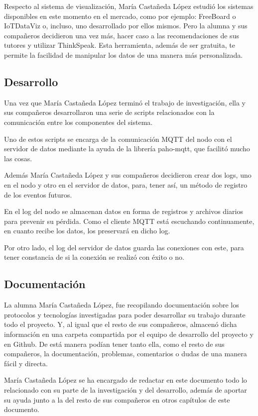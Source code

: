 Respecto al sistema de visualización, María Castañeda López estudió los sistemas disponibles en este momento en el mercado, como por ejemplo: FreeBoard o IoTDataViz o, incluso, uno desarrollado por ellos mismos. Pero la alumna y sus compañeros decidieron una vez más, hacer caso a las recomendaciones de sus tutores y utilizar ThinkSpeak. Esta herramienta, además de ser gratuita, te permite la facilidad de manipular los datos de una manera más personalizada. 

\subsection{Desarrollo}
Una vez que María Castañeda López terminó el trabajo de investigación, ella y sus compañeros desarrollaron una serie de scripts relacionados con la comunicación entre los componentes del sistema.

Uno de estos scripts se encarga de la comunicación MQTT del nodo con el servidor de datos mediante la ayuda de la librería paho-mqtt, que facilitó mucho las cosas.

Además María Castañeda López y sus compañeros decidieron crear dos logs, uno en el nodo y otro en el servidor de datos, para, tener así, un método de registro de los eventos futuros.

En el log del nodo se almacenan datos en forma de registros y archivos diarios para prevenir su pérdida. Como el cliente MQTT está escuchando continuamente, en cuanto recibe los datos, los preservará en dicho log.

Por otro lado, el log del servidor de datos guarda las conexiones con este, para tener constancia de si la conexión se realizó con éxito o no.

\subsection{Documentación}

La alumna María Castañeda López, fue recopilando documentación sobre los protocolos y tecnologías investigadas para poder desarrollar su trabajo durante todo el proyecto. Y, al igual que el resto de sus compañeros, almacenó dicha información en una carpeta compartida por el equipo de desarrollo del proyecto y en Github. De está manera podían tener tanto ella, como el resto de sus compañeros, la documentación, problemas, comentarios o dudas de una manera fácil y directa.

María Castañeda López se ha encargado de redactar en este documento todo lo relacionado con su parte de la investigación y del desarrollo, además de aportar su ayuda junto a la del resto de sus compañeros en otros capítulos de este documento.

